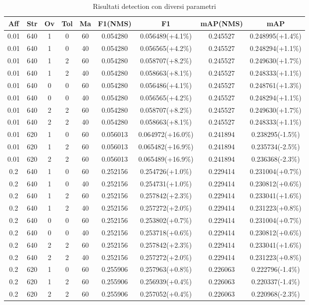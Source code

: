 \begin{table}[h!]
\centering
\begin{tabular}{|c|c|c|c|c|c|c|c|c|} 
\hline
Aff & Str & Ov & Tol & Ma & F1(NMS) & F1 & mAP(NMS) & mAP\\ [0.5ex] 
\hline
0.01 & 640 & 1 & 0 & 60 & 0.054280 & 0.056489(+4.1\%) & 0.245527 & 0.248995(+1.4\%)\\
0.01 & 640 & 1 & 0 & 40 & 0.054280 & 0.056565(+4.2\%) & 0.245527 & 0.248294(+1.1\%)\\
0.01 & 640 & 1 & 2 & 60 & 0.054280 & 0.058707(+8.2\%) & 0.245527 & 0.249630(+1.7\%)\\
0.01 & 640 & 1 & 2 & 40 & 0.054280 & 0.058663(+8.1\%) & 0.245527 & 0.248333(+1.1\%)\\
0.01 & 640 & 0 & 0 & 60 & 0.054280 & 0.056486(+4.1\%) & 0.245527 & 0.248761(+1.3\%)\\
0.01 & 640 & 0 & 0 & 40 & 0.054280 & 0.056565(+4.2\%) & 0.245527 & 0.248294(+1.1\%)\\
0.01 & 640 & 2 & 2 & 60 & 0.054280 & 0.058707(+8.2\%) & 0.245527 & 0.249630(+1.7\%)\\
0.01 & 640 & 2 & 2 & 40 & 0.054280 & 0.058663(+8.1\%) & 0.245527 & 0.248333(+1.1\%)\\
0.01 & 620 & 1 & 0 & 60 & 0.056013 & 0.064972(+16.0\%) & 0.241894 & 0.238295(-1.5\%)\\
0.01 & 620 & 1 & 2 & 60 & 0.056013 & 0.065482(+16.9\%) & 0.241894 & 0.235734(-2.5\%)\\
0.01 & 620 & 2 & 2 & 60 & 0.056013 & 0.065489(+16.9\%) & 0.241894 & 0.236368(-2.3\%)\\
0.2 & 640 & 1 & 0 & 60 & 0.252156 & 0.254726(+1.0\%) & 0.229414 & 0.231004(+0.7\%)\\
0.2 & 640 & 1 & 0 & 40 & 0.252156 & 0.254731(+1.0\%) & 0.229414 & 0.230812(+0.6\%)\\
0.2 & 640 & 1 & 2 & 60 & 0.252156 & 0.257842(+2.3\%) & 0.229414 & 0.233041(+1.6\%)\\
0.2 & 640 & 1 & 2 & 40 & 0.252156 & 0.257272(+2.0\%) & 0.229414 & 0.231223(+0.8\%)\\
0.2 & 640 & 0 & 0 & 60 & 0.252156 & 0.253802(+0.7\%) & 0.229414 & 0.231004(+0.7\%)\\
0.2 & 640 & 0 & 0 & 40 & 0.252156 & 0.253718(+0.6\%) & 0.229414 & 0.230812(+0.6\%)\\
0.2 & 640 & 2 & 2 & 60 & 0.252156 & 0.257842(+2.3\%) & 0.229414 & 0.233041(+1.6\%)\\
0.2 & 640 & 2 & 2 & 40 & 0.252156 & 0.257272(+2.0\%) & 0.229414 & 0.231223(+0.8\%)\\
0.2 & 620 & 1 & 0 & 60 & 0.255906 & 0.257963(+0.8\%) & 0.226063 & 0.222796(-1.4\%)\\
0.2 & 620 & 1 & 2 & 60 & 0.255906 & 0.256939(+0.4\%) & 0.226063 & 0.220337(-1.4\%)\\
0.2 & 620 & 2 & 2 & 60 & 0.255906 & 0.257052(+0.4\%) & 0.226063 & 0.220968(-2.3\%)\\
\hline
\end{tabular}
\caption{Risultati detection con diversi parametri}
\label{risultati detection con diversi parametri}
\end{table}
